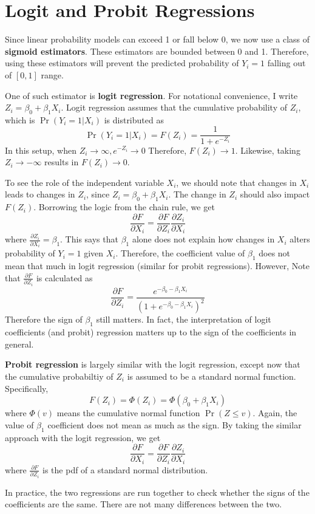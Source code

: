 \section{Logit and Probit Regressions}
Since linear probability models can exceed 1 or fall below 0, we now use a class of \textbf{sigmoid estimators}. These estimators are bounded between 0 and 1. Therefore, using these estimators will prevent the predicted probability of $Y_i=1$ falling out of $[0,1]$ range. \par\medskip
One of such estimator is \textbf{logit regression}. For notational convenience, I write $Z_i=\beta_0+\beta_1X_i$. Logit regression assumes that the cumulative probability of $Z_i$, which is $\Pr(Y_i=1|X_i)$  is distributed as
\[
\Pr(Y_i=1|X_i)=F(Z_i)=\frac{1}{1+e^{-Z_i}}
\]
In this setup, when $Z_i\to\infty, e^{-Z_i}\to0$ Therefore, $F(Z_i)\to1$. Likewise, taking $Z_i\to-\infty$ results in $F(Z_i)\to0$. \par\medskip
To see the role of the independent variable $X_i$, we should note that changes in $X_i$ leads to changes in $Z_i$, since $Z_i = \beta_0+\beta_1X_i$. The change in $Z_i$ should also impact $F(Z_i)$. Borrowing the logic from the chain rule, we get
\[
\frac{\partial F}{\partial X_i} = \frac{\partial F}{\partial Z_i}\frac{\partial Z_i}{\partial X_i}  
\]
where $\frac{\partial Z_i}{\partial X_i}  =\beta_1$. This says that $\beta_1$ alone does not explain how changes in $X_i$ alters probability of $Y_i=1$ given $X_i$.  Therefore, the coefficient value of $\beta_1$ does not mean that much in logit regression (similar for probit regressions). However, Note that $ \frac{\partial F}{\partial Z_i}$ is calculated as
\[
 \frac{\partial F}{\partial Z_i}=\frac{e^{-\beta_0 -\beta_1X_i}}{(1+e^{-\beta_0 -\beta_1X_i})^2}
\]
Therefore the sign of $\beta_1$ still matters. In fact, the interpretation of logit coefficients (and probit) regression matters up to the sign of the coefficients in general. \par\medskip
\textbf{Probit regression} is largely similar with the logit regression, except now that the cumulative probabiltiy of $Z_i$ is assumed to be a standard normal function. Specifically, 
\[
F(Z_i)= \Phi(Z_i)=\Phi(\beta_0+\beta_1X_i)
\]
where $\Phi(v)$ means the cumulative normal function $\Pr(Z\leq v)$. Again, the value of $\beta_1$ coefficient does not mean as much as the sign. By taking the similar approach with the logit regression, we get
\[
\frac{\partial F}{\partial X_i} = \frac{\partial F}{\partial Z_i}\frac{\partial Z_i}{\partial X_i} 
\]
 where $\frac{\partial F}{\partial Z_i}$ is the pdf of a standard normal distribution. \par\medskip
In practice, the two regressions are run together to check whether the signs of the coefficients are the same. There are not many differences between the two.\par\medskip
